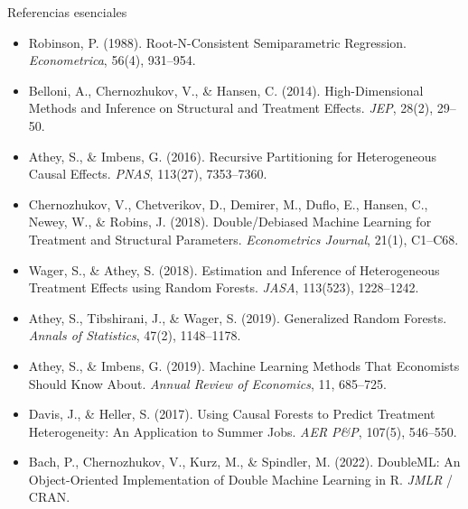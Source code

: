 \documentclass{beamer}
\newcommand{\1}{\mathbb{I}}
\begin{document}
\begin{frame}{Referencias esenciales}
\footnotesize
\begin{itemize}\itemsep2pt
  \item Robinson, P. (1988). Root-N-Consistent Semiparametric Regression. \emph{Econometrica}, 56(4), 931--954.
  \item Belloni, A., Chernozhukov, V., \& Hansen, C. (2014). High-Dimensional Methods and Inference on Structural and Treatment Effects. \emph{JEP}, 28(2), 29--50.
  \item Athey, S., \& Imbens, G. (2016). Recursive Partitioning for Heterogeneous Causal Effects. \emph{PNAS}, 113(27), 7353--7360.
  \item Chernozhukov, V., Chetverikov, D., Demirer, M., Duflo, E., Hansen, C., Newey, W., \& Robins, J. (2018). Double/Debiased Machine Learning for Treatment and Structural Parameters. \emph{Econometrics Journal}, 21(1), C1--C68.
  \item Wager, S., \& Athey, S. (2018). Estimation and Inference of Heterogeneous Treatment Effects using Random Forests. \emph{JASA}, 113(523), 1228--1242.
  \item Athey, S., Tibshirani, J., \& Wager, S. (2019). Generalized Random Forests. \emph{Annals of Statistics}, 47(2), 1148--1178.
  \item Athey, S., \& Imbens, G. (2019). Machine Learning Methods That Economists Should Know About. \emph{Annual Review of Economics}, 11, 685--725.
  \item Davis, J., \& Heller, S. (2017). Using Causal Forests to Predict Treatment Heterogeneity: An Application to Summer Jobs. \emph{AER P\&P}, 107(5), 546--550.
  \item Bach, P., Chernozhukov, V., Kurz, M., \& Spindler, M. (2022). DoubleML: An Object-Oriented Implementation of Double Machine Learning in R. \emph{JMLR} / CRAN.
\end{itemize}
\normalsize
\end{frame}

\end{document}
